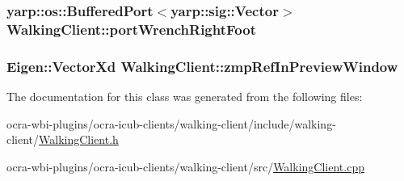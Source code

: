 \hypertarget{classWalkingClient_a96321dc60e84c193f2dea6e85983ca67}{
\subsubsection[{port\-Wrench\-Right\-Foot}]{\setlength{\rightskip}{0pt plus 5cm}yarp\-::os\-::\-Buffered\-Port$<$yarp\-::sig\-::\-Vector$>$ {\bf \-Walking\-Client\-::port\-Wrench\-Right\-Foot}}}\label{classWalkingClient_a96321dc60e84c193f2dea6e85983ca67}
\hypertarget{classWalkingClient_af28b3cd3b1202f83e193b098572fbdd3}{
\subsubsection[{zmp\-Ref\-In\-Preview\-Window}]{\setlength{\rightskip}{0pt plus 5cm}\-Eigen\-::\-Vector\-Xd {\bf \-Walking\-Client\-::zmp\-Ref\-In\-Preview\-Window}}}\label{classWalkingClient_af28b3cd3b1202f83e193b098572fbdd3}


\-The documentation for this class was generated from the following files\-:\begin{DoxyCompactItemize}
\item 
ocra-\/wbi-\/plugins/ocra-\/icub-\/clients/walking-\/client/include/walking-\/client/\hyperlink{WalkingClient_8h}{\-Walking\-Client.\-h}\item 
ocra-\/wbi-\/plugins/ocra-\/icub-\/clients/walking-\/client/src/\hyperlink{WalkingClient_8cpp}{\-Walking\-Client.\-cpp}\end{DoxyCompactItemize}
